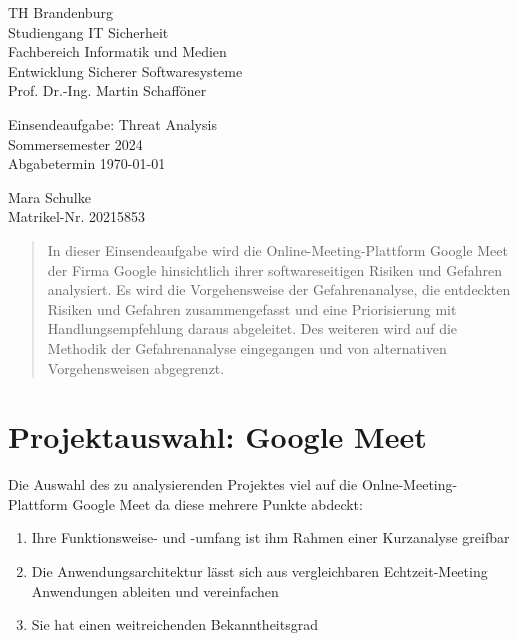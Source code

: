 \documentclass{article}
\begin{document}
\begin{titlepage}
	\begin{flushleft}
		TH Brandenburg \\
		Studiengang IT Sicherheit \\
		Fachbereich Informatik und Medien \\
		Entwicklung Sicherer Softwaresysteme \\
		Prof. Dr.-Ing. Martin Schafföner
	\end{flushleft}

	\vfill

	\begin{center}
		\Large{Einsendeaufgabe: Threat Analysis}\\[0.5em]
		\large{Sommersemester 2024}\\[0.25em]
		\large{Abgabetermin \today}
	\end{center}

	\vfill

	\begin{flushright}
		Mara Schulke \\
		Matrikel-Nr. 20215853
	\end{flushright}
\end{titlepage}

\begin{abstract}
	In dieser Einsendeaufgabe wird die Online-Meeting-Plattform Google Meet der Firma 
	Google hinsichtlich ihrer softwareseitigen Risiken und Gefahren analysiert.
	Es wird die Vorgehensweise der Gefahrenanalyse, die entdeckten Risiken und Gefahren 
	zusammengefasst und eine Priorisierung mit Handlungsempfehlung daraus abgeleitet. Des 
	weiteren wird auf die Methodik der Gefahrenanalyse eingegangen und von alternativen 
	Vorgehensweisen abgegrenzt.
\end{abstract}

\tableofcontents

\listoffigures

\section{Projektauswahl: Google Meet}

Die Auswahl des zu analysierenden Projektes viel auf die Onlne-Meeting-Plattform Google 
Meet da diese mehrere Punkte abdeckt:

\begin{enumerate}
	\item Ihre Funktionsweise- und -umfang ist ihm Rahmen einer Kurzanalyse greifbar
	\item Die Anwendungsarchitektur lässt sich aus vergleichbaren Echtzeit-Meeting Anwendungen ableiten und vereinfachen
	\item Sie hat einen weitreichenden Bekanntheitsgrad
\end{enumerate}
\end{document}
